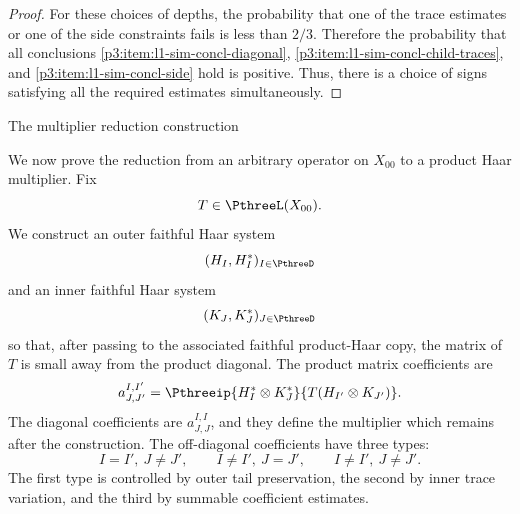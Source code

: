 \documentclass[11pt,reqno]{amsart}
\makeatletter
\theoremstyle{plain}
\theoremstyle{definition}
\newcounter{problempaper}
\newenvironment{problempaperbody}{%
  \setcounter{subsection}{0}%
  \setcounter{subsubsection}{0}%
  \setcounter{paragraph}{0}%
  \renewcommand{\thesubsection}{\arabic{subsection}}%
  \renewcommand{\thesubsubsection}{\thesubsection.\arabic{subsubsection}}%
  \renewcommand{\theparagraph}{\thesubsubsection.\arabic{paragraph}}%
  \let\problem@outersection\section
  \let\problem@outersubsection\subsection
  \let\problem@outersubsubsection\subsubsection
  \let\problem@outerparagraph\paragraph
  \let\section\problem@papersection
  \let\subsection\problem@papersubsection
  \let\subsubsection\problem@papersubsubsection
}{%
  \let\section\problem@outersection
  \let\subsection\problem@outersubsection
  \let\subsubsection\problem@outersubsubsection
  \let\paragraph\problem@outerparagraph
}
\newcommand{\problem@target}[2]{%
  \hypertarget{problem-\theproblempaper-#1-#2}{}%
}
\newcommand{\problem@paperheading}[3]{%
  \par\bigskip
  \problem@target{#1}{#2}%
  \noindent{\large\bfseries #2.\quad #3\par}%
  \nobreak\smallskip
}
\newcommand{\problem@papersubheading}[3]{%
  \par\medskip
  \problem@target{#1}{#2}%
  \noindent{\normalsize\bfseries #2.\quad #3\par}%
  \nobreak\smallskip
}
\newcommand{\problem@papersubsubheading}[3]{%
  \par\smallskip
  \problem@target{#1}{#2}%
  \noindent{\normalsize\itshape #2.\quad #3.\ }%
}
\def\problem@papersection{%
  \@ifstar{\problem@papersectionstar}{\problem@papersectionnostar}%
}
\def\problem@papersectionstar#1{%
  \par\bigskip\noindent{\large\bfseries #1\par}\nobreak\smallskip
}
\def\problem@papersectionnostar#1{%
  \refstepcounter{subsection}%
  \setcounter{subsubsection}{0}%
  \setcounter{paragraph}{0}%
  \problem@paperheading{section}{\thesubsection}{#1}%
  \problem@writecontentsline{section}{\thesubsection}{#1}%
}
\def\problem@papersubsection{%
  \@ifstar{\problem@papersubsectionstar}{\problem@papersubsectionnostar}%
}
\def\problem@papersubsectionstar#1{%
  \par\medskip\noindent{\normalsize\bfseries #1\par}\nobreak\smallskip
}
\def\problem@papersubsectionnostar#1{%
  \refstepcounter{subsubsection}%
  \setcounter{paragraph}{0}%
  \problem@papersubheading{subsection}{\thesubsubsection}{#1}%
  \problem@writecontentsline{subsection}{\thesubsubsection}{#1}%
}
\def\problem@papersubsubsection{%
  \@ifstar{\problem@papersubsubsectionstar}{\problem@papersubsubsectionnostar}%
}
\def\problem@papersubsubsectionstar#1{%
  \par\smallskip\noindent{\normalsize\itshape #1.\ }%
}
\def\problem@papersubsubsectionnostar#1{%
  \refstepcounter{paragraph}%
  \problem@papersubsubheading{subsubsection}{\theparagraph}{#1}%
  \problem@writecontentsline{subsubsection}{\theparagraph}{#1}%
}
\newcommand{\problem@writecontentsline}[3]{%
  \begingroup
  \protected@write\@auxout{}{%
    \string\problemcontentsentry{\theproblempaper}{#1}{#2}{#3}{\thepage}%
  }%
  \endgroup
}
\newcommand{\problemcontentsentry}[5]{%
  \@ifundefined{problemcontents@#1}{%
    \expandafter\gdef\csname problemcontents@#1\endcsname{}%
  }{}%
  \expandafter\g@addto@macro\csname problemcontents@#1\endcsname{%
    \problemcontentsline{#1}{#2}{#3}{#4}{#5}%
  }%
}
\newcommand{\problemcontentslink}[4]{%
  \hyperlink{problem-#1-#2-#3}{#4}%
}
\newcommand{\problemcontentsline}[5]{%
  \ifstrequal{#2}{section}{%
    \par\noindent
    \problemcontentslink{#1}{#2}{#3}{\makebox[2.5em][l]{#3}#4}%
    \nobreak\dotfill
    \problemcontentslink{#1}{#2}{#3}{#5}\par
  }{%
    \ifstrequal{#2}{subsection}{%
      \par\noindent\hspace*{1.5em}%
      \problemcontentslink{#1}{#2}{#3}{\makebox[3.5em][l]{#3}#4}%
      \nobreak\dotfill
      \problemcontentslink{#1}{#2}{#3}{#5}\par
    }{%
      \par\noindent\hspace*{3em}%
      \problemcontentslink{#1}{#2}{#3}{\makebox[4.5em][l]{#3}#4}%
      \nobreak\dotfill
      \problemcontentslink{#1}{#2}{#3}{#5}\par
    }%
  }%
}
\makeatother
\begin{document}
\begin{problempaperbody}
\begin{proof}
For these choices of depths, the probability that one of the trace estimates or one of the side constraints fails is less than $2/3$. Therefore the probability that all conclusions \ref{p3:item:l1-sim-concl-diagonal}, \ref{p3:item:l1-sim-concl-child-traces}, and \ref{p3:item:l1-sim-concl-side} hold is positive. Thus, there is a choice of signs satisfying all the required estimates simultaneously.
\end{proof}

\section{The multiplier reduction construction}
\label{p3:sec:multiplier-reduction-construction}
\label{p3:sec:strips-and-partial-constructions}
\label{p3:sec:reduction-to-multiplier}

We now prove the reduction from an arbitrary operator on $X_{00}$ to a product Haar multiplier. Fix
\begin{equation*}
        T\in\PthreeL(X_{00}).
\end{equation*}
We construct an outer faithful Haar system
\begin{equation*}
        (H_I,H_I^*)_{I\in\PthreeD}
\end{equation*}
and an inner faithful Haar system
\begin{equation*}
        (K_J,K_J^*)_{J\in\PthreeD}
\end{equation*}
so that, after passing to the associated faithful product-Haar copy, the matrix of $T$ is small away from the product diagonal. The product matrix coefficients are
\begin{equation}
\label{p3:eq:product-matrix-coefficients}
        a_{J,J'}^{I,I'}=\Pthreeip{H_I^*\otimes K_J^*}{T(H_{I'}\otimes K_{J'})}.
\end{equation}
The diagonal coefficients are $a_{J,J}^{I,I}$, and they define the multiplier which remains after the construction. The off-diagonal coefficients have three types:
\begin{equation*}
        I=I',\ J\ne J',\qquad I\ne I',\ J=J',\qquad I\ne I',\ J\ne J'.
\end{equation*}
The first type is controlled by outer tail preservation, the second by inner trace variation, and the third by summable coefficient estimates.


\end{problempaperbody}
\end{document}
